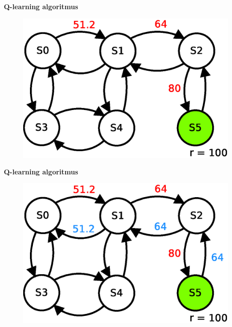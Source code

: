 \documentclass[xcolor=dvipsnames]{beamer}
\begin{document}
\begin{frame}{\bf Q-learning algoritmus}

\begin{figure}[!htb]
\includegraphics[scale=.5]{../diagrams/q_learning_table_04.eps}
\end{figure}

\end{frame}

\begin{frame}{\bf Q-learning algoritmus}

\begin{figure}[!htb]
\includegraphics[scale=.5]{../diagrams/q_learning_table_05.eps}
\end{figure}

\end{frame}
\end{document}
